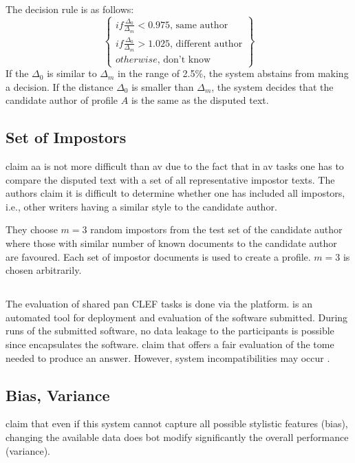 The decision rule is as follows:
$$\left\{ \begin{matrix}
if \frac{\Delta_0}{\Delta_m} < 0.975 \text{, same author} \\
if \frac{\Delta_0}{\Delta_m} > 1.025 \text{, different author}\\
otherwise \text{, don't know}
\end{matrix}\right\}$$
If the $\Delta_0$ is similar to $\Delta_m$ in the range of 2.5\%, the system abstains from making a decision.
If the distance $\Delta_0$ is smaller than $\Delta_m$, the system decides that the candidate author of profile $A$ is the same as the disputed text.

\subsection{Set of Impostors}

\citet{kocher_unine_2015} claim \ac{aa} is not more difficult than \ac{av} 
due to the fact that in \ac{av} tasks one has to compare the disputed text with a set of all representative impostor texts.
The authors claim it is difficult to determine whether one has included all impostors, 
i.e., other writers having a similar style to the candidate author.

They choose $m=3$ random impostors from the test set of the candidate author 
where those with similar number of known documents to the candidate author are favoured.
Each set of impostor documents is used to create a profile.
$m=3$ is chosen arbitrarily.

\subsection{\tira{}}
\label{sec:tira}

The evaluation of shared \ac{pan} CLEF tasks is done via the \tira{} platform.
\tira{} is an automated tool for deployment and evaluation of the software submitted.
During runs of the submitted software, no data leakage to the participants is possible since \tira{} encapsulates the software.
\citet{kocher_unine_2015} claim that \tira{} offers a fair evaluation of the tome needed to produce an answer.
However, system incompatibilities may occur \citep{kocher_unine_2015}.

\subsection{Bias, Variance}
\citet{kocher_unine_2015} claim that even if this system cannot capture all possible stylistic features (bias), 
changing the available data does bot modify significantly the overall performance (variance).
